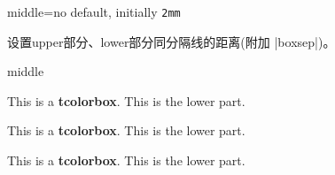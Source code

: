 \begin{docTcbKey}{middle}{=}{no default, initially \texttt{2mm}}

设置upper部分、lower部分同分隔线的距离(附加 |boxsep|)。
\begin{exdispExample}{middle}

\begin{tcolorbox}[middle=0mm,boxsep=0mm]
This is a \textbf{tcolorbox}.
\tcblower
This is the lower part.
\end{tcolorbox}
\begin{tcolorbox}[boxsep=0mm]
  This is a \textbf{tcolorbox}.
  \tcblower
  This is the lower part.
  \end{tcolorbox}
  \begin{tcolorbox}
    This is a \textbf{tcolorbox}.
    \tcblower
    This is the lower part.
    \end{tcolorbox}
\end{exdispExample}
\end{docTcbKey}


